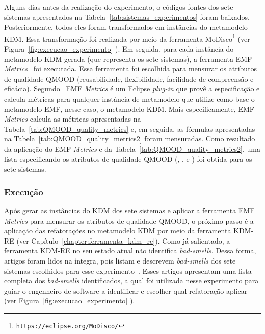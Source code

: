 Alguns dias antes da realização do experimento, o códigos-fontes dos sete sistemas apresentados na Tabela~\ref{tab:sistemas_experimentos} foram baixados. Posteriormente, todos eles foram transformados em instâncias do metamodelo KDM. Essa transformação foi realizada por meio da ferramenta MoDisco\footnote{\texttt{https://eclipse.org/MoDisco/}} (ver Figura~\ref{fig:execucao_experimento} ). Em seguida, para cada instância do metamodelo KDM gerada (que representa os sete sistemas), a ferramenta EMF \textit{Metrics}~\cite{Arendt_2012, Thorsten_2010_durelli} foi executada. Essa ferramenta foi escolhida para mensurar os atributos de qualidade QMOOD (reusabilidade, flexibilidade, facilidade de compreensão e eficácia). Segundo~ EMF \textit{Metrics} é um Eclipse \textit{plug-in} que provê a especificação e calcula métricas para qualquer instância de metamodelo que utilize como base o metamodelo EMF, nesse caso, o metamodelo KDM. Mais especificamente, EMF \textit{Metrics} calcula as métricas apresentadas na Tabela~\ref{tab:QMOOD_quality_metrics} e, em seguida, as fórmulas apresentadas na Tabela~\ref{tab:QMOOD_quality_metrics2} foram mensuradas. Como resultado da aplicação do EMF \textit{Metrics} e da Tabela~\ref{tab:QMOOD_quality_metrics2}, uma lista especificando os atributos de qualidade QMOOD (, ,  e ) foi obtida para os sete sistemas.

\subsubsection{Execução}

Após gerar as instâncias do KDM dos sete sistemas e aplicar a ferramenta EMF \textit{Metrics} para mensurar os atributos de qualidade QMOOD, o próximo passo é a aplicação das refatorações no metamodelo KDM por meio da ferramenta KDM-RE (ver Capítulo~\ref{chapter:ferramenta_kdm_re}). Como já salientado, a ferramenta KDM-RE no seu estado atual não identifica \textit{bad-smells}. Dessa forma, artigos foram lidos na íntegra, pois listam e descrevem \textit{bad-smells} dos sete sistemas escolhidos para esse experimento~\cite{Kessentini_2011, Ouni_2013, Moha_2010, Kessentini_2010}. Esses artigos apresentam uma lista completa dos \textit{bad-smells} identificados, a qual foi utilizada nesse experimento para guiar o engenheiro de software a identificar e escolher qual refatoração aplicar (ver Figura~\ref{fig:execucao_experimento} ).

